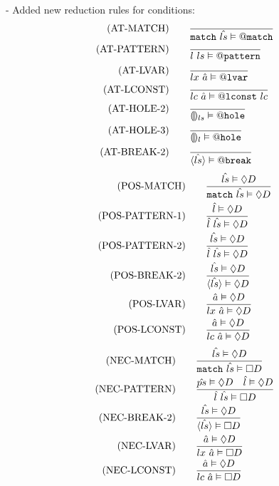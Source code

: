 \documentclass[10pt,a4paper,english]{article}
\begin{document}
- Added new reduction rules for conditions:
\begin{align}
  (\text{AT-MATCH})\qquad&\frac{}{\texttt{match}~\hat{ls} \vDash @\texttt{match}}\\
  (\text{AT-PATTERN})\qquad&\frac{}{l~ls \vDash @\texttt{pattern}}\\
  (\text{AT-LVAR})\qquad&\frac{}{lx~\hat{a} \vDash @\texttt{lvar}}\\
  (\text{AT-LCONST})\qquad&\frac{}{lc~\hat{a} \vDash @\texttt{lconst}~lc}\\
  (\text{AT-HOLE-2})\qquad&\frac{}{\llparenthesis\rrparenthesis_{ls} \vDash @\texttt{hole}}\\
  (\text{AT-HOLE-3})\qquad&\frac{}{\llparenthesis\rrparenthesis_{l} \vDash @\texttt{hole}}\\
  (\text{AT-BREAK-2})\qquad&\frac{}{\langle \hat{ls} \rangle \vDash @\texttt{break}}
\end{align}
\begin{align}
  (\text{POS-MATCH})\qquad&\frac{\hat{ls}\vDash\Diamond D}{\texttt{match}~\hat{ls} \vDash \Diamond D}\\
  (\text{POS-PATTERN-1})\qquad&\frac{\hat{l}\vDash\Diamond D}{\hat{l}~\hat{ls} \vDash \Diamond D}\\
  (\text{POS-PATTERN-2})\qquad&\frac{\hat{ls}\vDash\Diamond D}{\hat{l}~\hat{ls} \vDash \Diamond D}\\
  (\text{POS-BREAK-2})\qquad&\frac{\hat{ls}\vDash\Diamond D}{\langle \hat{ls} \rangle \vDash \Diamond D}\\
  (\text{POS-LVAR})\qquad&\frac{\hat{a}\vDash\Diamond D}{lx~\hat{a} \vDash \Diamond D}\\
  (\text{POS-LCONST})\qquad&\frac{\hat{a}\vDash\Diamond D}{lc~\hat{a} \vDash \Diamond D}
\end{align}
\begin{align}
  (\text{NEC-MATCH})\qquad&\frac{\hat{ls}\vDash\Diamond D}{\texttt{match}~\hat{ls} \vDash \Box D}\\
  (\text{NEC-PATTERN})\qquad&\frac{\hat{ps}\vDash\Diamond D\quad\hat{l}\vDash\Diamond D}{\hat{l}~\hat{ls} \vDash \Box D}\\
  (\text{NEC-BREAK-2})\qquad&\frac{\hat{ls}\vDash\Diamond D}{\langle \hat{ls} \rangle \vDash \Box D}\\
  (\text{NEC-LVAR})\qquad&\frac{\hat{a}\vDash\Diamond D}{lx~\hat{a} \vDash \Box D}\\
  (\text{NEC-LCONST})\qquad&\frac{\hat{a}\vDash\Diamond D}{lc~\hat{a} \vDash \Box D}
\end{align}
\end{document}
